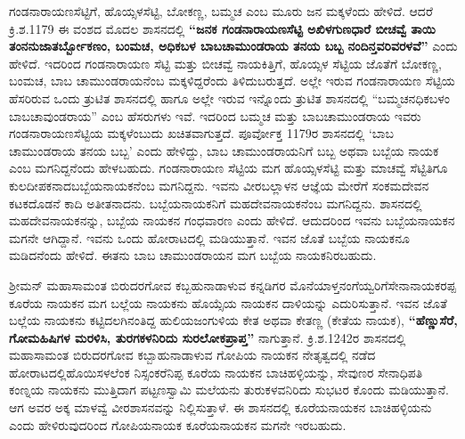 ಗಂಡನಾರಾಯಣಸೆಟ್ಟಿಗೆ, ಹೊಯ್ಸಳಸೆಟ್ಟಿ, ಬೋಕಣ್ಣ, ಬಮ್ಮಚ ಎಂಬ ಮೂರು ಜನ ಮಕ್ಕಳೆಂದು ಹೇಳಿದೆ. ಆದರೆ ಕ್ರಿ.ಶ.1179 ಈ ವಂಶದ ಮೊದಲ ಶಾಸನದಲ್ಲಿ \textbf{“ಜನಕ ಗಂಡನಾರಾಯಣಸೆಟ್ಟಿ ಅಖಿಳಗುಣಧಾರೆ ಬೀಚವ್ವೆ ತಾಯಿ\general{\break } ತಂನನುಜಾತರ್ಬ್ಬೋಕಣಂ, ಬಂಮಚ, ಅಧಿಕಬಳ ಬಾಬಚಾಮುಂಡರಾಯ ತನಯ ಬಬ್ಬ ನಂದಿನ್ತವರಿವರಳವೆ” }ಎಂದು ಹೇಳಿದೆ. ಇದರಿಂದ ಗಂಡನಾರಾಯಣ ಸೆಟ್ಟಿ ಮತ್ತು ಬೀಚವ್ವೆ ನಾಯಕಿತ್ತಿಗೆ, ಹೊಯ್ಸಳ ಸೆಟ್ಟಿಯ ಜೊತೆಗೆ ಬೋಕಣ್ಣ, ಬಂಮಚ, ಬಾಬ ಚಾಮುಂಡರಾಯನೆಂಬ ಮಕ್ಕಳಿದ್ದರೆಂದು ತಿಳಿದುಬರುತ್ತದೆ. ಅಲ್ಲೇ ಇರುವ ಗಂಡನಾರಾಯಣ ಸೆಟ್ಟಿಯ ಹೆಸರಿರುವ ಒಂದು ತ್ರುಟಿತ ಶಾಸನದಲ್ಲಿ ಹಾಗೂ ಅಲ್ಲೇ ಇರುವ ಇನ್ನೊಂದು ತ್ರುಟಿತ ಶಾಸನದಲ್ಲಿ “ಬಮ್ಮಚನಧಿಕಬಳಂ ಬಾಬಚಾವುಂಡರಾಯ” ಎಂಬ ಹೆಸರುಗಳು ಇವೆ. ಇದರಿಂದ ಬಮ್ಮಚ ಮತ್ತು ಬಾಬಚಾಮುಂಡರಾಯ ಇವರು ಗಂಡನಾರಾಯಣಸೆಟ್ಟಿಯ ಮಕ್ಕಳೆಂಬುದು ಖಚಿತವಾಗುತ್ತದೆ. ಪೂರ್ವೋಕ್ತ 1179ರ ಶಾಸನದಲ್ಲಿ ‘ಬಾಬ ಚಾಮುಂಡರಾಯ ತನಯ ಬಬ್ಬ’ ಎಂದು ಹೇಳಿದ್ದು, ಬಾಬ ಚಾಮುಂಡರಾಯನಿಗೆ ಬಬ್ಬ ಅಥವಾ ಬಬ್ಬೆಯ ನಾಯಕ ಎಂಬ ಮಗನಿದ್ದನೆಂದು ಹೇಳಬಹುದು. ಗಂಡನಾರಾಯಣ ಸೆಟ್ಟಿಯ ಮಗ ಹೊಯ್ಸಳಸೆಟ್ಟಿ ಮತ್ತು ಮಾಚವ್ವೆ ಸೆಟ್ಟಿತಿಗೂ ಕುಲದೀಪಕನಾದ\break ಬಬ್ಬೆಯನಾಯಕನೆಂಬ ಮಗನಿದ್ದನು. ಇವನು ವೀರಬಲ್ಲಾಳನ ಆಜ್ಞೆಯ ಮೇರೆಗೆ ಸಂಕಮದೇವನ ಕಟಕದೊಡನೆ ಕಾದಿ ಅತೀತನಾದನು. ಬಬ್ಬೆಯನಾಯಕನಿಗೆ ಮಹದೇವನಾಯಕನೆಂಬ ಮಗನಿದ್ದನು. ಶಾಸನದಲ್ಲಿ ಮಹದೇವನಾಯಕನನ್ನು, ಬಬ್ಬೆಯ ನಾಯಕನ ಗಂಧವಾರಣ ಎಂದು ಹೇಳಿದೆ. ಆದುದರಿಂದ ಇವನು ಬಬ್ಬೆಯನಾಯಕನ ಮಗನೇ ಆಗಿದ್ದಾನೆ. ಇವನು ಒಂದು ಹೋರಾಟದಲ್ಲಿ ಮಡಿಯುತ್ತಾನೆ. ಇವನ ಜೊತೆ ಬಬ್ಬೆಯ ನಾಯಕನೂ ಮಡಿದನೆಂದು ಹೇಳಿದೆ. ಈತನು ಬಾಬ ಚಾಮುಂಡರಾಯನ ಮಗ ಬಬ್ಬೆಯ ನಾಯಕನಿರಬಹುದು.

ಶ‍್ರೀಮನ್​ ಮಹಾಸಾಮಂತ ಬಿರುದರಗೋವ ಕಬ್ಬಹುನಾಡಾಳುವ ಕನ್ನಡಿಗರ ಮೊನೆಯಾಳ್ತನಂಗೆಯ್ವರಿಗೆ\break ಸೇನಾನಾಯಕರಪ್ಪ ಕೂರೆಯ ನಾಯಕನ ಮಗ ಬಲ್ಲೆಯ ನಾಯಕನು ಹೊಯ್ಸೆಯ ನಾಯಕನ ದಾಳಿಯನ್ನು ಎದುರಿಸುತ್ತಾನೆ. ಇವನ ಜೊತೆ ಬಲ್ಲೆಯ ನಾಯಕನು ಕಟ್ಟಿದಲಗಿನಂತಿದ್ದ ಹುಲಿಯಜಂಗುಳಿಯ ಕೇತ ಅಥವಾ ಕೇತಣ್ಣ (ಕೇತೆಯ ನಾಯಕ), \textbf{“ಹೆಣ್ಣುಸೆರೆ, ಗೋಮಹಿಷಿಗಳ ಮರಳಿಸಿ, ತುರಗಕಳನಿರಿದು ಸುರಲೋಕಪ್ರಾಪ್ತ”} ನಾಗುತ್ತಾನೆ. ಕ್ರಿ.ಶ.1242ರ ಶಾಸನದಲ್ಲಿ ಮಹಾಸಾಮಂತ ಬಿರುದರಗೋವ ಕಬ್ಬಾಹುನಾಡಾಳುವ ಗೋಪಿಯ ನಾಯಕನ ನೇತೃತ್ವದಲ್ಲಿ ನಡೆದ ಹೋರಾಟದಲ್ಲಿ\break ಹೊಯಿಸಳಲೆಂಕ ನಿಸ್ಸಂಕರೆನಿಪ್ಪ ಕೂರೆಯ ನಾಯಕನ ಬಾಚಿಹಳ್ಳಿಯನ್ನು, ಸೇವುಣರ ಸೇನಾಧಿಪತಿ ಕಂಣ್ನಯ ನಾಯಕನು ಮುತ್ತಿದಾಗ ಪಟ್ಟಣಸ್ವಾಮಿ ಮಲೆಯನು ತುರುಕಳವನಿರಿದು ಸುಭಟರ ಕೊಂದು ಮಡಿಯುತ್ತಾನೆ. ಆಗ ಅವರ ಅಕ್ಕ ಮಾಳವ್ವೆ ವೀರಶಾಸನವನ್ನು ನಿಲ್ಲಿಸುತ್ತಾಳೆ. ಈ ಶಾಸನದಲ್ಲಿ ಕೂರೆಯನಾಯಕನ ಬಾಚಿಹಳ್ಳಿಯನು ಎಂದು ಹೇಳಿರುವುದರಿಂದ ಗೋಪಿಯನಾಯಕ ಕೂರೆಯನಾಯಕನ ಮಗನೇ ಇರಬಹುದು.

